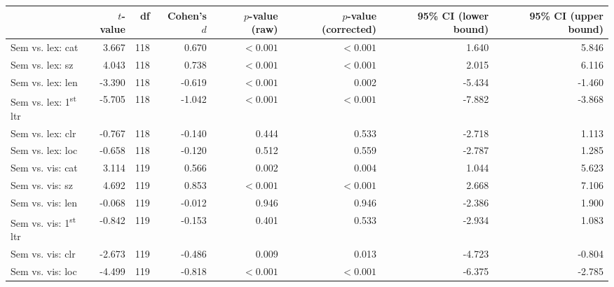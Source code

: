 \begin{tabular}{lrrrrrrr}
\toprule
{} & $t$-value &  df & Cohen's $d$ & $p$-value (raw) & $p$-value (corrected) & 95\% CI (lower bound) & 95\% CI (upper bound) \\
\midrule
Sem vs. lex: cat                       &     3.667 & 118 &       0.670 &       $< 0.001$ &             $< 0.001$ &                 1.640 &                 5.846 \\
Sem vs. lex: sz                        &     4.043 & 118 &       0.738 &       $< 0.001$ &             $< 0.001$ &                 2.015 &                 6.116 \\
Sem vs. lex: len                       &    -3.390 & 118 &      -0.619 &       $< 0.001$ &                 0.002 &                -5.434 &                -1.460 \\
Sem vs. lex: 1\textsuperscript{st} ltr &    -5.705 & 118 &      -1.042 &       $< 0.001$ &             $< 0.001$ &                -7.882 &                -3.868 \\
Sem vs. lex: clr                       &    -0.767 & 118 &      -0.140 &           0.444 &                 0.533 &                -2.718 &                 1.113 \\
Sem vs. lex: loc                       &    -0.658 & 118 &      -0.120 &           0.512 &                 0.559 &                -2.787 &                 1.285 \\
Sem vs. vis: cat                       &     3.114 & 119 &       0.566 &           0.002 &                 0.004 &                 1.044 &                 5.623 \\
Sem vs. vis: sz                        &     4.692 & 119 &       0.853 &       $< 0.001$ &             $< 0.001$ &                 2.668 &                 7.106 \\
Sem vs. vis: len                       &    -0.068 & 119 &      -0.012 &           0.946 &                 0.946 &                -2.386 &                 1.900 \\
Sem vs. vis: 1\textsuperscript{st} ltr &    -0.842 & 119 &      -0.153 &           0.401 &                 0.533 &                -2.934 &                 1.083 \\
Sem vs. vis: clr                       &    -2.673 & 119 &      -0.486 &           0.009 &                 0.013 &                -4.723 &                -0.804 \\
Sem vs. vis: loc                       &    -4.499 & 119 &      -0.818 &       $< 0.001$ &             $< 0.001$ &                -6.375 &                -2.785 \\
\bottomrule
\end{tabular}
